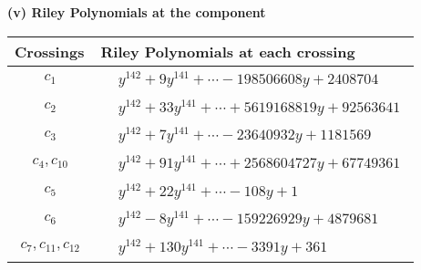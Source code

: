 \documentclass[1p]{elsarticle_modified}
\theoremstyle{definition}
\begin{document}
\newpage\renewcommand{\arraystretch}{1}
\flushleft \textbf{(v) Riley Polynomials at the component}\newline \\
\begin{tabular}{m{50pt}|m{274pt}}
Crossings & \hspace{64pt}Riley Polynomials at each crossing \\
\hline $$\begin{aligned}c_{1}\end{aligned}$$&$\begin{aligned}
&y^{142}+9 y^{141}+\cdots-198506608 y+2408704
\end{aligned}$\\
\hline $$\begin{aligned}c_{2}\end{aligned}$$&$\begin{aligned}
&y^{142}+33 y^{141}+\cdots+5619168819 y+92563641
\end{aligned}$\\
\hline $$\begin{aligned}c_{3}\end{aligned}$$&$\begin{aligned}
&y^{142}+7 y^{141}+\cdots-23640932 y+1181569
\end{aligned}$\\
\hline $$\begin{aligned}c_{4},c_{10}\end{aligned}$$&$\begin{aligned}
&y^{142}+91 y^{141}+\cdots+2568604727 y+67749361
\end{aligned}$\\
\hline $$\begin{aligned}c_{5}\end{aligned}$$&$\begin{aligned}
&y^{142}+22 y^{141}+\cdots-108 y+1
\end{aligned}$\\
\hline $$\begin{aligned}c_{6}\end{aligned}$$&$\begin{aligned}
&y^{142}-8 y^{141}+\cdots-159226929 y+4879681
\end{aligned}$\\
\hline $$\begin{aligned}c_{7},c_{11},c_{12}\end{aligned}$$&$\begin{aligned}
&y^{142}+130 y^{141}+\cdots-3391 y+361
\end{aligned}$\\

\end{tabular}
\end{document}
